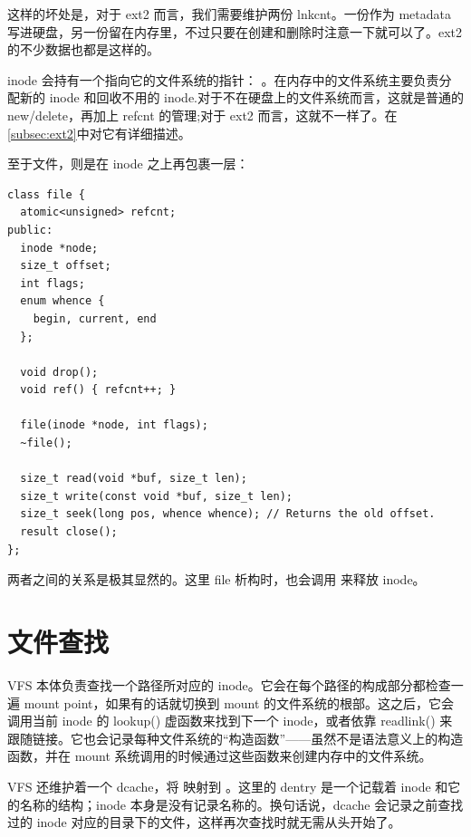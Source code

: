 这样的坏处是，对于 ext2 而言，我们需要维护两份 lnkcnt。一份作为 metadata 写进硬盘，另一份留在内存里，不过只要在创建和删除时注意一下就可以了。ext2 的不少数据也都是这样的。

inode 会持有一个指向它的文件系统的指针： 。在内存中的文件系统主要负责分配新的 inode 和回收不用的 inode.对于不在硬盘上的文件系统而言，这就是普通的 new/delete，再加上 refcnt 的管理;对于 ext2 而言，这就不一样了。在\cref{subsec:ext2}中对它有详细描述。

至于文件，则是在 inode 之上再包裹一层：
\begin{verbatim}
class file {
  atomic<unsigned> refcnt;
public:
  inode *node;
  size_t offset;
  int flags;
  enum whence {
    begin, current, end
  };

  void drop();
  void ref() { refcnt++; }

  file(inode *node, int flags);
  ~file();

  size_t read(void *buf, size_t len);
  size_t write(const void *buf, size_t len);
  size_t seek(long pos, whence whence); // Returns the old offset.
  result close();
};
\end{verbatim}

两者之间的关系是极其显然的。这里 file 析构时，也会调用  来释放 inode。

\section{文件查找}

VFS 本体负责查找一个路径所对应的 inode。它会在每个路径的构成部分都检查一遍 mount point，如果有的话就切换到 mount 的文件系统的根部。这之后，它会调用当前 inode 的 lookup() 虚函数来找到下一个 inode，或者依靠 readlink() 来跟随链接。它也会记录每种文件系统的“构造函数”——虽然不是语法意义上的构造函数，并在 mount 系统调用的时候通过这些函数来创建内存中的文件系统。

VFS 还维护着一个 dcache，将  映射到 。这里的 dentry 是一个记载着 inode 和它的名称的结构；inode 本身是没有记录名称的。换句话说，dcache 会记录之前查找过的 inode 对应的目录下的文件，这样再次查找时就无需从头开始了。





